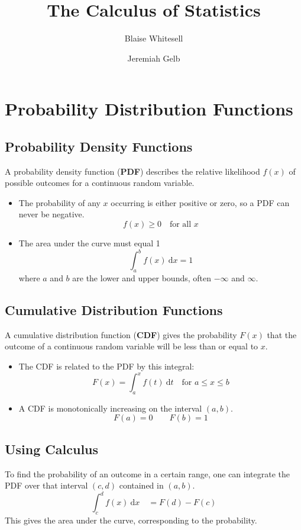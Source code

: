 \documentclass[11pt,leqno,letterpaper]{article}
\title{\Huge{The Calculus of Statistics}}
\author{\Large{Blaise Whitesell} \and \Large{Jeremiah Gelb}}
\begin{document}
\newcommand{\bdef}[1]{\textbf{#1}} %
\newcommand{\dx}{\:\mathrm{d}x} %
\newcommand{\dt}{\:\mathrm{d}t} %
\newcommand{\dth}{\:\mathrm{d}\theta} %
\newcommand{\ddt}{\frac{\mathrm{d}}{\mathrm{d}t}} %
\theoremstyle{definition} \newtheorem{problem}{Problem}
\newcommand{\psep}{\hrule \vspace{1 ex}} %
\newcommand{\AM}{\textsc{am}}
\maketitle
\vspace{2 em}
\section{Probability Distribution Functions}
\subsection{Probability Density Functions}
A probability density function (\bdef{PDF}) describes
the relative likelihood $f(x)$ of possible outcomes
for a continuous random variable.
\begin{itemize}
\item The probability of any $x$ occurring is either positive or zero,
so a PDF can never be negative.
\[
f(x) \geq 0 \quad \text{for all }x
\]
\item The area under the curve must equal 1
\[
\int_a^b f(x)\dx = 1
\]
where $a$ and $b$ are the lower and upper bounds,
often $-\infty$ and $\infty$.
\end{itemize}
\subsection{Cumulative Distribution Functions}
A cumulative distribution function (\bdef{CDF}) gives
the probability $F(x)$ that the outcome of a
continuous random variable will be less than or equal to $x$.
\begin{itemize}
\item The CDF is related to the PDF by this integral:
\[
F(x) = \int_a^x f(t) \dt \quad \text{for } a \leq x \leq b
\]
\item A CDF is monotonically increasing on the interval $(a,b)$.
\[
F(a) = 0 \qquad F(b) = 1
\]
\end{itemize}
\subsection{Using Calculus}
To find the probability of an outcome in a certain range,
one can integrate the PDF over that interval
$(c,d)$ contained in $(a,b)$.
\[
\int_c^d f(x) \dx \quad = F(d) - F(c)
\]
This gives the area under the curve, corresponding to the probability.
\end{document}
